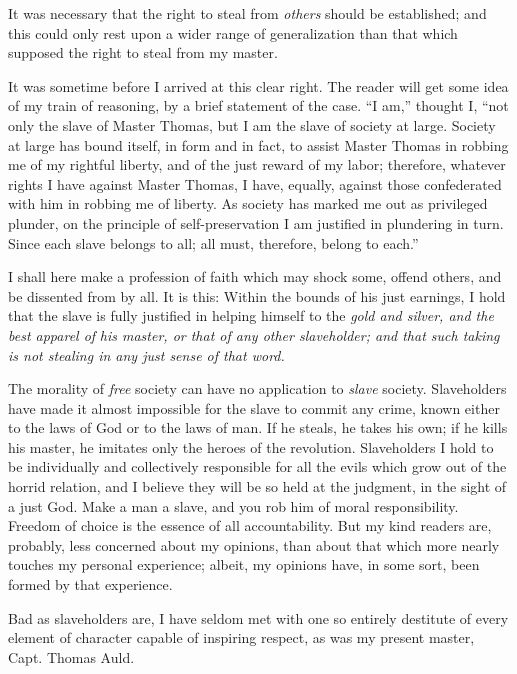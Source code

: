 It was necessary that the right to steal from \emph{others} should be
established; and this could only rest upon a wider range of
generalization than that which supposed the right to steal from my
master.

It was sometime before I arrived at this clear right. The reader will
get some idea of my train of reasoning, by a brief statement of the
case. ``I am,'' thought I, ``not only the slave of Master Thomas, but I
am the slave of society at large. Society at large has bound itself, in
form and in fact, to assist Master Thomas in robbing me of my rightful
liberty, and of the just reward of my labor; therefore, whatever rights
I have against Master Thomas, I have, equally, against those
confederated with him in robbing me of liberty. As society has marked me
out as privileged plunder, on the principle of self-preservation I am
justified in plundering in turn. Since each slave belongs to all; all
must, therefore, belong to each.''

I shall here make a profession of faith which may shock some, offend
others, and be dissented from by all. It is this: Within the bounds of
his just earnings, I hold that the slave is fully justified in helping
himself to the \emph{gold and silver, and the best apparel of}
{\protect\hypertarget{191}{}{}}\emph{his master, or that of any other
slaveholder; and that such taking is not stealing in any just sense of
that word.}

The morality of \emph{free} society can have no application to
\emph{slave} society. Slaveholders have made it almost impossible for
the slave to commit any crime, known either to the laws of God or to the
laws of man. If he steals, he takes his own; if he kills his master, he
imitates only the heroes of the revolution. Slaveholders I hold to be
individually and collectively responsible for all the evils which grow
out of the horrid relation, and I believe they will be so held at the
judgment, in the sight of a just God. Make a man a slave, and you rob
him of moral responsibility. Freedom of choice is the essence of all
accountability. But my kind readers are, probably, less concerned about
my opinions, than about that which more nearly touches my personal
experience; albeit, my opinions have, in some sort, been formed by that
experience.

Bad as slaveholders are, I have seldom met with one so entirely
destitute of every element of character capable of inspiring respect, as
was my present master, Capt. Thomas Auld.

